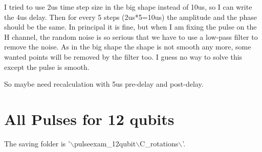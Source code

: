 \documentclass[prl,onecolumn]{revtex4-1}
\newcommand{\dir}{$\backslash$}
\begin{document}
I tried to use 2us time step size in the big shape instead of 10us, so I can write the 4us delay. Then for every 5 steps (2us*5=10us) the amplitude and the phase should be the same. In principal it is fine, but when I am fixing the pulse on the H channel, the random noise is so serious that we have to use a low-pass filter to remove the noise. As in the big shape the shape is not smooth any more, some wanted points will be removed by the filter too. I guess no way to solve this except the pulse is smooth. 

So maybe need recalculation with 5us pre-delay and post-delay.

\newpage
\section{All Pulses for 12 qubits}

The saving folder is '\dir pulseexam\_12qubit\dir C\_rotations\dir'.
\end{document}
